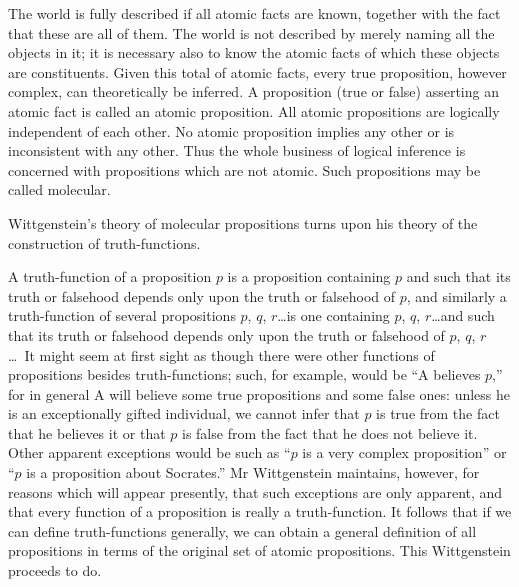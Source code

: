 \documentclass[12pt,oneside]{book}[2007/10/19]
\begin{document}
The world is fully described if all atomic facts are
known, together with the fact that these are all of them.
The world is not described by merely naming all the
objects in it; it is necessary also to know the atomic facts
of which these objects are constituents. Given this total
of atomic facts, every true proposition, however complex,
can theoretically be inferred. A proposition (true or
false) asserting an atomic fact is called an atomic proposition.
All atomic propositions are logically independent
of each other. No atomic proposition implies any other
or is inconsistent with any other. Thus the whole business
of logical inference is concerned with propositions which
are not atomic. Such propositions may be called
molecular.

Wittgenstein's theory of molecular propositions turns
upon his theory of the construction of truth-functions.

A truth-function of a proposition $p$ is a proposition
containing $p$ and such that its truth or falsehood depends
only upon the truth or falsehood of $p$, and similarly a
truth-function of several propositions $p$, $q$, $r$\ldots is one
containing $p$, $q$, $r$\ldots and such that its truth or falsehood
depends only upon the truth or falsehood of
$p$, $q$, $r$\ldots\ It might seem at first sight as though there
were other functions of propositions besides truth-functions;
such, for example, would be ``A believes $p$,'' for in general
A will believe some true propositions and some false
ones: unless he is an exceptionally gifted individual, we
cannot infer that $p$ is true from the fact that he believes
it or that $p$ is false from the fact that he does not believe
it. Other apparent exceptions would be such as ``$p$ is a
very complex proposition'' or ``$p$ is a proposition about
Socrates.'' Mr Wittgenstein maintains, however, for
reasons which will appear presently, that such exceptions
are only apparent, and that every function of a proposition
is really a truth-function. It follows that if we can
define truth-functions generally, we can obtain a general
definition of all propositions in terms of the original set
of atomic propositions. This Wittgenstein proceeds to
do.
\end{document}

